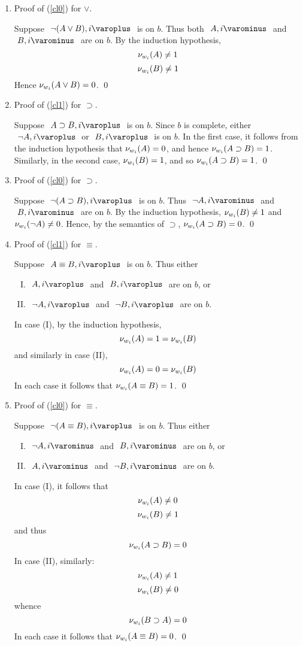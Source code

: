 \begin{proof*}
\begin{enumerate}
	\item Proof of (\ref{cl0}) for $ \vee $.
	
			Suppose $ \like{ \dNodei{ \neg (A \vee B ) } } $ is on $b$.
			Thus both $ \like{ \uNodei{A} } $ and $ \like{ \uNodei{B}} $ are on $b$.
			By the induction hypothesis, 
			\[ \mathcal{\nu}_{ w_i }({A}) \neq 1 \]
			\[ \mathcal{\nu}_{ w_i }({B}) \neq 1 \]
			Hence $ \mathcal{\nu}_{ w_i }({ A \vee B }) = 0 $.
			\qed
			
\pagebreak	

	\item Proof of (\ref{cl1}) for $ \supset $.
	
			Suppose $ \like{ \dNodei{A \supset B } } $ is on $ b $. 
			Since $b$ is complete, either $\like{ \dNodei{\neg A} }$ or $\like{ \dNodei{B} }$ is on $b$.
			In the first case, it follows from the induction hypothesis that $ \mathcal{\nu}_{ w_i }({A}) = 0 $, and hence $ \mathcal{\nu}_{ w_i }({ A \supset B }) = 1 $.
			Similarly, in the second case, $ \mathcal{\nu}_{ w_i }({B}) = 1 $, and so $ \mathcal{\nu}_{ w_i }({ A \supset B }) = 1 $.
			\qed

	\item Proof of (\ref{cl0}) for $ \supset $.

			Suppose $ \like{ \dNodei{ \neg (A \supset B) } } $ is on $b$.
			Thus $ \like{ \uNodei{ \neg A }} $ and $ \like{ \uNodei{ B }} $ are on $ b $.
			By the induction hypothesis, $ \mathcal{\nu}_{ w_i }({ B }) \neq 1$ and $ \mathcal{\nu}_{ w_i }({ \neg A }) \neq 0$.
			Hence, by the semantics of $ \supset $, $ \mathcal{\nu}_{ w_i }({ A \supset B }) = 0 $.
			\qed

	\item Proof of (\ref{cl1}) for $ \equiv $.
	
			Suppose $ \like{ \dNodei{ A \equiv B } } $ is on $ b $.
			Thus either
			\begin{enumerate}[(I)]
				\item $ \like{ \dNodei{ A } } $ and $ \like{ \dNodei{ B } } $ are on $ b $, or
				\item $ \like{ \dNodei{ \neg A } } $ and $ \like{ \dNodei{ \neg B } } $ are on $ b $.
			\end{enumerate}
			In case (I), by the induction hypothesis, 
			\[ \mathcal{\nu}_{ w_i }({ A }) = 1 = \mathcal{\nu}_{ w_i }({ B }) \]
			and similarly in case (II), 
			\[ \mathcal{\nu}_{ w_i }({ A }) = 0 = \mathcal{\nu}_{ w_i }({ B }) \]
			In each case it follows that $ \mathcal{\nu}_{ w_i }({ A \equiv B }) = 1 $.
			\qed
			
	\item Proof of (\ref{cl0}) for $ \equiv $.
	
			Suppose $ \like{ \dNodei{ \neg (A \equiv B) }} $ is on $ b $.
			Thus either
			\begin{enumerate}[(I)]
				\item $ \like{ \uNodei{ \neg A } } $ and $ \like{ \uNodei{ B } } $ are on $ b $, or
				\item $ \like{ \uNodei{ A } } $ and $ \like{ \uNodei{ \neg B } } $ are on $ b $.
			\end{enumerate}
			In case (I), it follows that 
			\[ \mathcal{\nu}_{ w_i }({ A }) \neq 0 \]
			\[ \mathcal{\nu}_{ w_i }({ B }) \neq 1 \]
			and thus
			\[ \mathcal{\nu}_{ w_i }({ A \supset B }) = 0 \]
			In case (II), similarly:
			\[ \mathcal{\nu}_{ w_i }({ A }) \neq 1 \]
			\[ \mathcal{\nu}_{ w_i }({ B }) \neq 0 \]
			whence
			\[ \mathcal{\nu}_{ w_i }({ B \supset A }) = 0 \]
			In each case it follows that $ \mathcal{\nu}_{ w_i }({ A \equiv B }) = 0 $.
			\qed


\end{enumerate}
\end{proof*}
